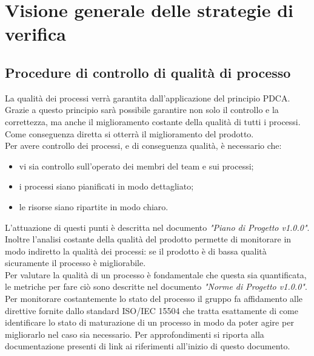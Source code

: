\documentclass[12pt,a4paper,titlepage]{article}
\begin{document}
	\newpage
	\section{Visione generale delle strategie di verifica}
	\subsection{Procedure di controllo di qualità di processo}
	La qualità dei processi verrà garantita dall'applicazione del principio PDCA. Grazie a questo principio sarà possibile garantire non solo il controllo e la correttezza, ma anche il miglioramento costante della qualità di tutti i processi. Come conseguenza diretta si otterrà il miglioramento del prodotto.\\
	Per avere controllo dei processi, e di conseguenza qualità, è necessario che:
	\begin{itemize}
		\item vi sia controllo sull'operato dei membri del team e sui processi;
		\item i processi siano pianificati in modo dettagliato;
		\item le risorse siano ripartite in modo chiaro.
	\end{itemize}
	L'attuazione di questi punti è descritta nel documento \textit{"Piano di Progetto v1.0.0"}. Inoltre l'analisi costante della qualità del prodotto permette di monitorare in modo indiretto la qualità dei processi: se il prodotto è di bassa qualità sicuramente il processo è migliorabile.\\
	Per valutare la qualità di un processo è fondamentale che questa sia quantificata, le metriche per fare ciò sono descritte nel documento \textit{"Norme di Progetto v1.0.0"}.\\
	
	Per monitorare costantemente lo stato del processo il gruppo fa affidamento alle direttive fornite dallo standard ISO/IEC 15504 che tratta esattamente di come identificare lo stato di maturazione di un processo in modo da poter agire per migliorarlo nel caso sia necessario. Per approfondimenti si riporta alla documentazione presenti di link ai riferimenti all'inizio di questo documento.\\
	
\end{document}
